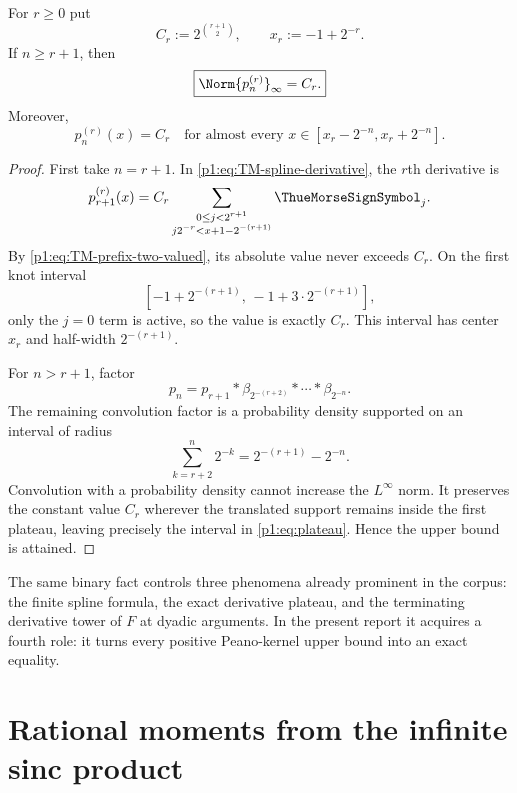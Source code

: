 \documentclass[11pt]{article}
\numberwithin{equation}{section}
\theoremstyle{definition}
\theoremstyle{remark}
\begin{document}
\begin{lemma}
\label{p1:lem:plateau}
For $r\ge0$ put
\begin{equation}
 C_r:=2^{\binom{r+1}{2}},
 \qquad
 x_r:=-1+2^{-r}.
 \label{p1:eq:Cr-xr}
\end{equation}
If $n\ge r+1$, then
\begin{equation}
 \boxed{\Norm{p_n^{(r)}}_\infty=C_r.}
 \label{p1:eq:derivative-norm}
\end{equation}
Moreover,
\begin{equation}
 p_n^{(r)}(x)=C_r
 \quad\text{for almost every }x\in[x_r-2^{-n},x_r+2^{-n}].
 \label{p1:eq:plateau}
\end{equation}
\end{lemma}

\begin{proof}
First take $n=r+1$.  In \eqref{p1:eq:TM-spline-derivative}, the $r$th derivative is
\[
 p_{r+1}^{(r)}(x)=C_r
 \sum_{\substack{0\le j<2^{r+1}\\ j2^{-r}<x+1-2^{-(r+1)}}}\ThueMorseSignSymbol_j.
\]
By \eqref{p1:eq:TM-prefix-two-valued}, its absolute value never exceeds $C_r$.  On the first knot interval
\[
 [-1+2^{-(r+1)},\,-1+3\cdot2^{-(r+1)}],
\]
only the $j=0$ term is active, so the value is exactly $C_r$.  This interval has center $x_r$ and half-width $2^{-(r+1)}$.

For $n>r+1$, factor
\[
 p_n=p_{r+1}*\beta_{2^{-(r+2)}}*\cdots*\beta_{2^{-n}}.
\]
The remaining convolution factor is a probability density supported on an interval of radius
\[
 \sum_{k=r+2}^{n}2^{-k}=2^{-(r+1)}-2^{-n}.
\]
Convolution with a probability density cannot increase the $L^\infty$ norm.  It preserves the constant value $C_r$ wherever the translated support remains inside the first plateau, leaving precisely the interval in \eqref{p1:eq:plateau}.  Hence the upper bound is attained.
\end{proof}

\begin{remark}
The same binary fact controls three phenomena already prominent in the corpus: the finite spline formula, the exact derivative plateau, and the terminating derivative tower of $F$ at dyadic arguments.  In the present report it acquires a fourth role: it turns every positive Peano-kernel upper bound into an exact equality.
\end{remark}

\section{Rational moments from the infinite sinc product}
\label{p1:sec:moments}
\end{document}
